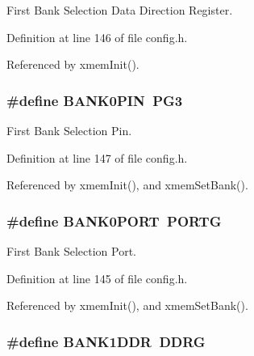 First Bank Selection Data Direction Register. 



Definition at line 146 of file config.\-h.



Referenced by xmem\-Init().

\hypertarget{group__config_gaa176e9b2752f764cd7e7d9fd49d46af8}{
\subsubsection[{B\-A\-N\-K0\-P\-I\-N}]{\setlength{\rightskip}{0pt plus 5cm}\#define B\-A\-N\-K0\-P\-I\-N~P\-G3}}\label{group__config_gaa176e9b2752f764cd7e7d9fd49d46af8}


First Bank Selection Pin. 



Definition at line 147 of file config.\-h.



Referenced by xmem\-Init(), and xmem\-Set\-Bank().

\hypertarget{group__config_gabeec1986c81588dde8863b7936028fc9}{
\subsubsection[{B\-A\-N\-K0\-P\-O\-R\-T}]{\setlength{\rightskip}{0pt plus 5cm}\#define B\-A\-N\-K0\-P\-O\-R\-T~P\-O\-R\-T\-G}}\label{group__config_gabeec1986c81588dde8863b7936028fc9}


First Bank Selection Port. 



Definition at line 145 of file config.\-h.



Referenced by xmem\-Init(), and xmem\-Set\-Bank().

\hypertarget{group__config_gada13cb9312072b48628763a6e1fd50d3}{
\subsubsection[{B\-A\-N\-K1\-D\-D\-R}]{\setlength{\rightskip}{0pt plus 5cm}\#define B\-A\-N\-K1\-D\-D\-R~D\-D\-R\-G}}\label{group__config_gada13cb9312072b48628763a6e1fd50d3}


